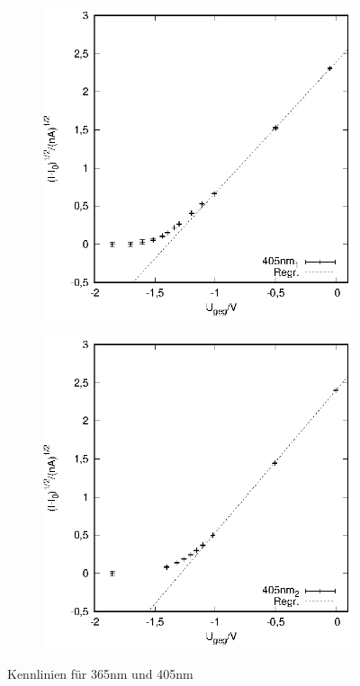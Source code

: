 \begin{figure}[h!]
\begin{subfigure}[h]{0.5\textwidth}
  \end{subfigure}
    \begin{subfigure}[h]{0.5\textwidth}
    \centering
    \includegraphics{data/Messung_photoeffekt/405nm_1.eps}
  \end{subfigure}%
  \begin{subfigure}[h]{0.5\textwidth}
    \centering
    \includegraphics{data/Messung_photoeffekt/405nm_2.eps}
  \end{subfigure}
  \caption{Kennlinien für 365nm und 405nm}
  \label{kennlinien1}
\end{figure}

